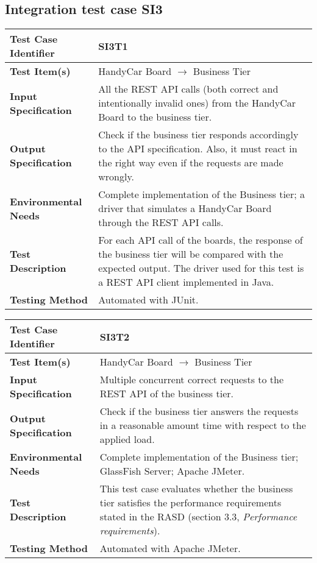 \vspace{2em}

\subsection{Integration test case SI3}
\label{sec:performance-business}

\begin{tabular}{l p{}}
    \hline
    \textbf{Test Case Identifier} & SI3T1\\
    \hline
    \textbf{Test Item(s)} & HandyCar Board $\rightarrow$ Business Tier\\
    \hline
    \textbf{Input Specification} & All the REST API calls (both correct and intentionally invalid ones) from the HandyCar Board to the business tier.\\
    \hline
    \textbf{Output Specification} & Check if the business tier responds accordingly to the API specification. Also, it must react in the right way even if the requests are made wrongly.\\
    \hline
    \textbf{Environmental Needs} & Complete implementation of the Business tier; a driver that simulates a HandyCar Board through the REST API calls. \\
    \hline
    \textbf{Test Description} & For each API call of the boards, the response of the business tier will be compared with the expected output. The driver used for this test is a REST API client implemented in Java.\\
    \hline
    \textbf{Testing Method} & Automated with JUnit.\\
    \hline
\end{tabular}

\vspace{2em}

\noindent\begin{tabular}{l p{}}
    \hline
    \textbf{Test Case Identifier} & SI3T2\\
    \hline
    \textbf{Test Item(s)} & HandyCar Board $\rightarrow$ Business Tier\\
    \hline
    \textbf{Input Specification} & Multiple concurrent correct requests to the REST API of the business tier.\\
    \hline
    \textbf{Output Specification} & Check if the business tier answers the requests in a reasonable amount time with respect to the applied load. \\
    \hline
    \textbf{Environmental Needs} & Complete implementation of the Business tier; GlassFish Server; Apache JMeter.\\
    \hline
    \textbf{Test Description} & This test case evaluates whether the business tier satisfies the performance requirements stated in the RASD (section 3.3, \emph{Performance requirements}).\\
    \hline
    \textbf{Testing Method} & Automated with Apache JMeter. \\
    \hline
\end{tabular}